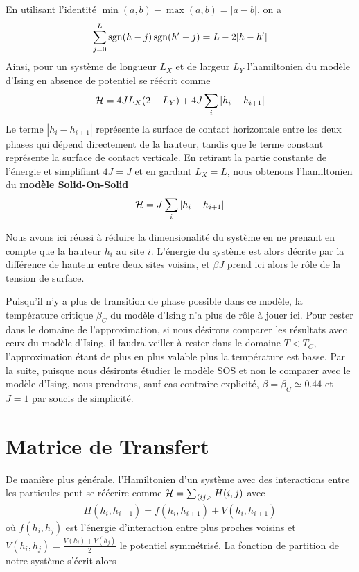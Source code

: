 En utilisant l'identité $\min(a,b)-\max(a,b)=|a-b|$, on a
\begin{align*}
    \sum_{j=0}^L \operatorname{sgn}(h-j)\operatorname{sgn}(h'-j) = L - 2 |h-h'|
\end{align*}
Ainsi, pour un système de longueur $L_X$ et de largeur $L_Y$ l'hamiltonien du modèle d'Ising en absence de potentiel se réécrit comme 
\begin{align}
    \mathcal{H} = 4 J L_X (2-L_Y) +4J \sum_i |h_i-h_{i+1}|
\end{align}
Le terme $|h_i-h_{i+1}|$ représente la surface de contact horizontale entre les deux phases qui dépend directement de la hauteur, tandis que le terme constant représente la surface de contact verticale.
En retirant la partie constante de l'énergie et simplifiant $4 J = J$ et en gardant $L_X = L$, nous obtenons l'hamiltonien du \textbf{modèle Solid-On-Solid}
\begin{align}
    \mathcal{H} = J \sum_i |h_i-h_{i+1}|
    \label{hamil-sos}
\end{align}

Nous avons ici réussi à réduire la dimensionalité du système en ne prenant en compte que la hauteur $h_i$ au site $i$. L'énergie du système est alors décrite par la différence de hauteur entre deux sites voisins, et $\beta J$ prend ici alors le rôle de la tension de surface.

Puisqu'il n'y a plus de transition de phase possible dans ce modèle, la température critique $\beta_C$ du modèle d'Ising n'a plus de rôle à jouer ici. Pour rester dans le domaine de l'approximation, si nous désirons comparer les résultats avec ceux du modèle d'Ising, il faudra veiller à rester dans le domaine $T \less T_C$, l'approximation étant de plus en plus valable plus la température est basse. Par la suite, puisque nous désironts étudier le modèle SOS et non le comparer avec le modèle d'Ising, nous prendrons, sauf cas contraire explicité, $\beta = \beta_C \simeq 0.44$ et $J=1$ par soucis de simplicité. 

  \section{Matrice de Transfert}

	De manière plus générale, l'Hamiltonien d'un système avec des interactions entre les particules peut se réécrire comme $\mathcal{H} = \sum_{\langle ij >} H(i,j)$ avec
\begin{align*}
  H(h_i,h_{i+1}) = f(h_i,h_{i+1}) + V(h_i,h_{i+1}) 
\end{align*}
où $f(h_i,h_j)$ est l'énergie d'interaction entre plus proches voisins et $V(h_i,h_j)=\frac{V(h_i)+V(h_j)}{2}$ le potentiel symmétrisé.
La fonction de partition de notre système s'écrit alors 

